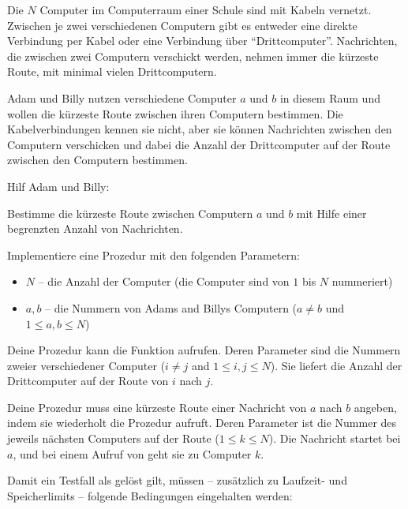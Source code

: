 \documentclass{boi2014-de}
\begin{document}
    Die $N$ Computer im Computerraum einer Schule sind mit Kabeln vernetzt.
    Zwischen je zwei verschiedenen Computern gibt es entweder eine direkte Verbindung per Kabel
    oder eine Verbindung über ``Drittcomputer''.  Nachrichten, die zwischen zwei
    Computern verschickt werden, nehmen immer die kürzeste Route, mit minimal
    vielen Drittcomputern.
        
    Adam und Billy nutzen verschiedene Computer $a$ und $b$ in diesem Raum
    und wollen die kürzeste Route zwischen ihren Computern bestimmen.
    Die Kabelverbindungen kennen sie nicht, aber sie können Nachrichten zwischen
    den Computern verschicken und dabei die Anzahl der Drittcomputer auf der Route
    zwischen den Computern bestimmen.

    Hilf Adam und Billy:

    \Task
    Bestimme die kürzeste Route zwischen Computern $a$ und $b$ mit
    Hilfe einer begrenzten Anzahl von Nachrichten.

    \Implementation
    Implementiere eine Prozedur  mit den folgenden Parametern:

    \begin{itemize}
        \item $N$ -- die Anzahl der Computer
            (die Computer sind von $1$ bis $N$ nummeriert)
        \item $a, b$ -- die Nummern von Adams and Billys Computern
            ($a \neq b$ und $1 \le a, b \le N$)
    \end{itemize}

    Deine Prozedur  kann die Funktion  aufrufen.
    Deren Parameter sind die Nummern zweier verschiedener Computer
    ($i \neq j$ and $1 \le i, j \le N$).
    Sie liefert die Anzahl der Drittcomputer auf der Route von $i$ nach $j$.

    Deine Prozedur  muss eine kürzeste Route
    einer Nachricht von $a$ nach $b$ angeben,
    indem sie wiederholt die Prozedur  aufruft.
    Deren Parameter ist die Nummer des jeweils nächsten Computers auf der Route
    ($1 \le k \le N$). Die Nachricht startet bei $a$, und bei einem Aufruf von
     geht sie zu Computer $k$.

    Damit ein Testfall als gelöst gilt, müssen -- zusätzlich zu Laufzeit-
    und Speicherlimits -- folgende Bedingungen eingehalten werden:
\end{document}
